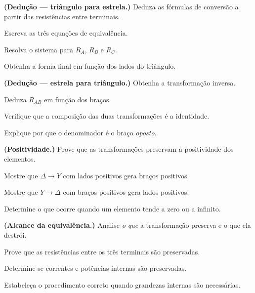 \blocodesafio
\begin{questao}[4]{}

\textbf{(Dedução --- triângulo para estrela.)} Deduza as fórmulas de conversão a
partir das resistências entre terminais.
\begin{itensq}
\item Escreva as três equações de equivalência.
\item Resolva o sistema para $R_A$, $R_B$ e $R_C$.
\item Obtenha a forma final em função dos lados do triângulo.
\end{itensq}


\end{questao}
\begin{questao}[4]{}

\textbf{(Dedução --- estrela para triângulo.)} Obtenha a transformação inversa.
\begin{itensq}
\item Deduza $R_{AB}$ em função dos braços.
\item Verifique que a composição das duas transformações é a identidade.
\item Explique por que o denominador é o braço \emph{oposto}.
\end{itensq}


\end{questao}
\begin{questao}[4]{}

\textbf{(Positividade.)} Prove que as transformações preservam a positividade
dos elementos.
\begin{itensq}
\item Mostre que $\Delta\to Y$ com lados positivos gera braços positivos.
\item Mostre que $Y\to\Delta$ com braços positivos gera lados positivos.
\item Determine o que ocorre quando um elemento tende a zero ou a infinito.
\end{itensq}


\end{questao}
\begin{questao}[4]{}

\textbf{(Alcance da equivalência.)} Analise \emph{o que} a transformação
preserva e o que ela destrói.
\begin{itensq}
\item Prove que as resistências entre os três terminais são preservadas.
\item Determine se correntes e potências internas são preservadas.
\item Estabeleça o procedimento correto quando grandezas internas são
      necessárias.
\end{itensq}


\end{questao}
